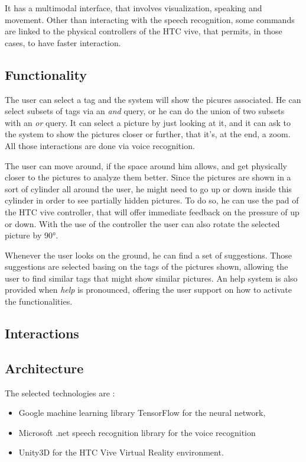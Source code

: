 \documentclass[11pt,a4paper]{article}
\begin{document}
It has a multimodal interface, that involves visualization, speaking and movement.
Other than interacting with the speech recognition, some commands are linked to the physical controllers of the HTC vive, that permits, in those cases, to have faster interaction.

\subsection{Functionality}

The user can select a tag and the system will show the picures associated.
He can select subsets of tags via an \textit{and} query, or he can do the union of two subsets with an \textit{or} query.
It can select a picture by just looking at it, and it can ask to the system to show the pictures closer or further, that it's, at the end, a zoom. All those interactions are done via voice recognition.

The user can move around, if the space around him allows, and get physically closer to the pictures to analyze them better.
Since the pictures are shown in a sort of cylinder all around the user, he might need to go up or down inside this cylinder in order to see partially hidden pictures. To do so, he can use the pad of the HTC vive controller, that will offer immediate feedback on the pressure of up or down. With the use of the controller the user can also rotate the selected picture by 90°.

Whenever the user looks on the ground, he can find a set of suggestions. Those suggestions are selected basing on the tags of the pictures shown, allowing the user to find similar tags that might show similar pictures.
An help system is also provided when \textit{help} is pronounced, offering the user support on how to activate the functionalities.

\subsection{Interactions}


\subsection{Architecture} \label{techntechno}


The selected technologies are :
\begin{itemize}
	\item Google machine learning library TensorFlow for the neural network,
	\item Microsoft .net speech recognition library for the voice recognition
	\item Unity3D for the HTC Vive Virtual Reality environment.
\end{itemize}
\end{document}
